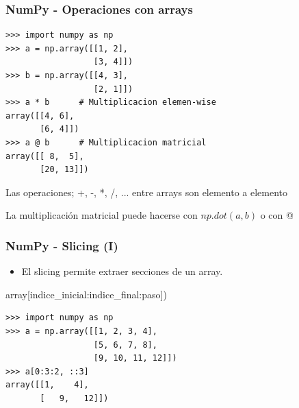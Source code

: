 \documentclass[18pt]{beamer}
\begin{document}
\begin{frame}[fragile]

	\frametitle{NumPy - Operaciones con arrays}
	
	\begin{exampleblock}
		        
    	\small
    	\begin{lstlisting}
>>> import numpy as np
>>> a = np.array([[1, 2], 
                  [3, 4]])
>>> b = np.array([[4, 3], 
                  [2, 1]])
>>> a * b      # Multiplicacion elemen-wise
array([[4, 6],
       [6, 4]])
>>> a @ b      # Multiplicacion matricial
array([[ 8,  5],
       [20, 13]])
		\end{lstlisting}
		
	\end{exampleblock}

	\begin{alertblock}{Las operaciones; +, -, *, /, ... entre arrays 
	son elemento a elemento}
	
		La multiplicación matricial puede hacerse con 
		$np.dot(a, b)$ o con @
		
	\end{alertblock}	
	
\end{frame}


\begin{frame}[fragile]
	
	\frametitle{NumPy - Slicing (I)}
	
	\begin{itemize}
		\item El slicing permite extraer secciones de un array. 
	\end{itemize}
	
	\begin{block}
	
		\centering
		array[indice\_inicial:indice\_final:paso])
		
	\end{block}
				
	\begin{exampleblock}
		
    	\small
    	\begin{lstlisting}
>>> import numpy as np
>>> a = np.array([[1, 2, 3, 4], 
                  [5, 6, 7, 8], 
                  [9, 10, 11, 12]])
>>> a[0:3:2, ::3]
array([[1,    4],
       [   9,   12]])
		\end{lstlisting}
	\end{exampleblock}			
	
\end{frame}
\end{document}
